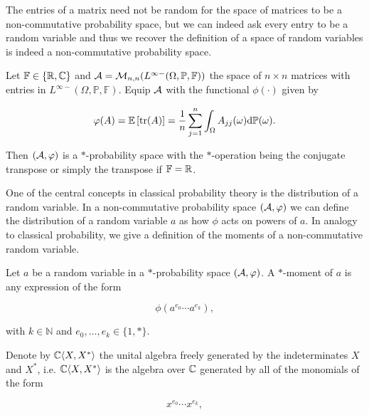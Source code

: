     The entries of a matrix need not be random for the space of matrices to be a non-commutative probability space, but we can indeed ask every entry to be a random variable and thus we recover the definition of a space of random variables is indeed a non-commutative probability space.

    \begin{example}
        Let  $\mathbb F \in \{\mathbb R,\mathbb C\}$ and $\mathcal A = \mathcal M_{n,n}(L^{\infty-}(\Omega,\mathbb P,\mathbb F))$ the space of $n\times n$ matrices with entries in $L^{\infty-}(\Omega,\mathbb P,\mathbb F)$. Equip $\mathcal A$ with the functional $\phi(\cdot)$ given by

        \begin{equation*}
            \varphi(A) = \mathbb E \left[  \mathrm{tr}(A)  \right] = \frac1n\sum_{j=1}^n \int_{\Omega} A_{jj}(\omega) \mathrm d \mathbb P(\omega).
        \end{equation*}

        Then $(\mathcal A, \varphi)$ is a $*$-probability space with the $*$-operation being the conjugate transpose or simply the transpose if $\mathbb F = \mathbb R$.
    \end{example}

    One of the central concepts in classical probability theory is the distribution of a random variable. In a non-commutative probability space $(\mathcal A,\varphi)$ we can define the distribution of a random variable $a$ as how $\phi$ acts on powers of $a$. In analogy to classical probability, we give a definition of the moments of a non-commutative random variable.

    \begin{definition} \label{def:star_moment}
        Let $a$ be a random variable in a $*$-probability space $(\mathcal A,\varphi)$. A $*$-moment of $a$ is any expression of the form

        \begin{equation*}
            \phi(a^{e_0}\cdots a^{e_k}),
        \end{equation*}

        \noindent with $k \in \mathbb{N}$ and $e_0, \dots, e_k \in \{1,*\}$.
    \end{definition}

    Denote by $\mathbb C\langle X, X^*\rangle$ the unital algebra freely generated by the indeterminates $X$ and $X^*$, i.e. $\mathbb C\langle X,X^*\rangle$ is the algebra over $\mathbb C$ generated by all of the monomials of the form

    \begin{equation*}
        x^{e_0}\cdots x^{e_k},
    \end{equation*}

